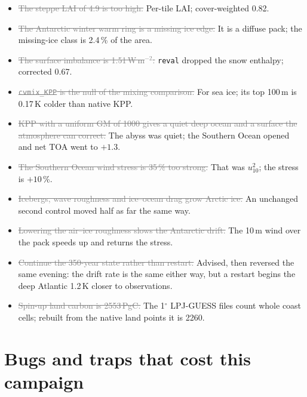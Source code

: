 \documentclass[10pt]{article}
\newcommand{\dead}[1]{\textcolor{gray}{\sout{#1}}}
\begin{document}
\begin{itemize}
LPJ-GUESS is not coupled.
\item \dead{The steppe LAI of 4.9 is too high.} Per-tile LAI; cover-weighted 0.82.
\item \dead{The Antarctic winter warm ring is a missing ice edge.} It is a diffuse pack; the
missing-ice class is 2.4\,\% of the area.
\item \dead{The surface imbalance is 1.51\,W\,m$^{-2}$.} \texttt{reval} dropped the snow enthalpy;
corrected 0.67.
\item \dead{\texttt{cvmix\_KPP} is the null of the mixing comparison.} For sea ice; its top 100\,m
is 0.17\,K colder than native KPP.
\item \dead{KPP with a uniform GM of 1000 gives a quiet deep ocean and a surface the atmosphere can
correct.} The abyss was quiet; the Southern Ocean opened and net TOA went to $+1.3$.
\item \dead{The Southern Ocean wind stress is 35\,\% too strong.} That was $u_{10}^2$; the stress is
$+10$\,\%.
\item \dead{Icebergs, wave roughness and ice--ocean drag grow Arctic ice.} An unchanged second control
moved half as far the same way.
\item \dead{Lowering the air--ice roughness slows the Antarctic drift.} The 10\,m wind over the pack
speeds up and returns the stress.
\item \dead{Continue the 350-year state rather than restart.} Advised, then reversed the same evening:
the drift rate is the same either way, but a restart begins the deep Atlantic 1.2\,K closer to
observations.
\item \dead{Spin-up land carbon is 2553\,PgC.} The 1$^\circ$ LPJ-GUESS files count whole coast cells;
rebuilt from the native land points it is 2260.
\end{itemize}

\section{Bugs and traps that cost this campaign}\label{sec:traps}
\end{document}
